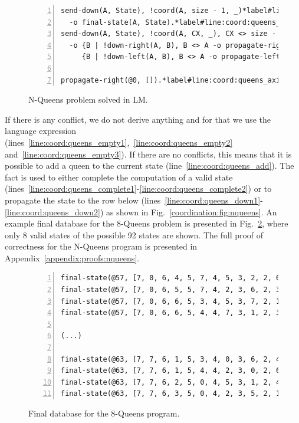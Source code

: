 \begin{figure}[h!]
\begin{Verbatim}[numbers=left,fontsize=\scriptsize,commandchars=\*\#\&]
send-down(A, State), !coord(A, size - 1, _)*label#line:coord:queens_complete1&*hfill// Rule 13: final state
  -o final-state(A, State).*label#line:coord:queens_complete2&
send-down(A, State), !coord(A, CX, _), CX <> size - 1*label#line:coord:queens_down1&*hfill// Rule 14: propagate the state down
  -o {B | !down-right(A, B), B <> A -o propagate-right(B, State)},
     {B | !down-left(A, B), B <> A -o propagate-left(B, State)}.*label#line:coord:queens_down2&

propagate-right(@0, []).*label#line:coord:queens_axiom&*hfill// Initial fact
\end{Verbatim}
  \caption{N-Queens problem solved in LM.}
  \label{code:coordination:nqueens}
\end{figure}

If there is any conflict, we do not derive anything and for that we use the
language expression 
(lines~\ref{line:coord:queens_empty1},~\ref{line:coord:queens_empty2}
and~\ref{line:coord:queens_empty3}). If there are no conflicts, this means that
it is possible to add a queen to the current state
(line~\ref{line:coord:queens_add}). The fact  is used to either
complete the computation of a valid state
(lines~\ref{line:coord:queens_complete1}-\ref{line:coord:queens_complete2}) or
to propagate the state to the row below
(lines~\ref{line:coord:queens_down1}-\ref{line:coord:queens_down2}) as shown in
Fig.~\ref{coordination:fig:nqueens}.  An example final database for the 8-Queens
problem is presented in Fig.~\ref{code:coordination:8queens}, where only 8 valid
states of the possible 92 states are shown. The full proof of correctness for
the N-Queens program is presented in Appendix~\ref{appendix:proofs:nqueens}.

\begin{figure}[h!]
\begin{Verbatim}[numbers=left,fontsize=\codesize,commandchars=\*\#\&]
final-state(@57, [7, 0, 6, 4, 5, 7, 4, 5, 3, 2, 2, 6, 1, 1, 0, 3]).*hfill// States at square (7, 0)
final-state(@57, [7, 0, 6, 5, 5, 7, 4, 2, 3, 6, 2, 3, 1, 1, 0, 4])
final-state(@57, [7, 0, 6, 6, 5, 3, 4, 5, 3, 7, 2, 1, 1, 4, 0, 2])
final-state(@57, [7, 0, 6, 6, 5, 4, 4, 7, 3, 1, 2, 3, 1, 5, 0, 2])

(...)

final-state(@63, [7, 7, 6, 1, 5, 3, 4, 0, 3, 6, 2, 4, 1, 2, 0, 5])*hfill// States at square (7, 7)
final-state(@63, [7, 7, 6, 1, 5, 4, 4, 2, 3, 0, 2, 6, 1, 3, 0, 5])
final-state(@63, [7, 7, 6, 2, 5, 0, 4, 5, 3, 1, 2, 4, 1, 6, 0, 3])
final-state(@63, [7, 7, 6, 3, 5, 0, 4, 2, 3, 5, 2, 1, 1, 6, 0, 4])
\end{Verbatim}
  \caption{Final database for the 8-Queens program.}
  \label{code:coordination:8queens}
\end{figure}

